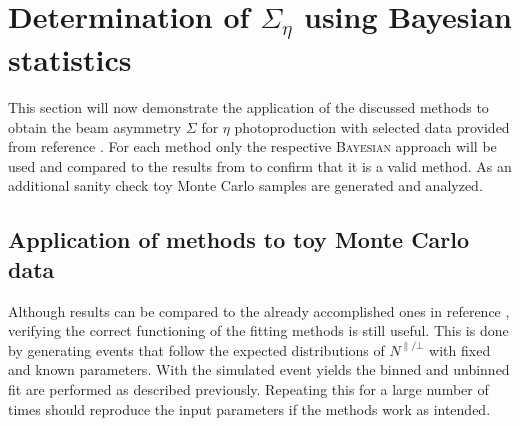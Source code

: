 \section{Determination of $\Sigma_{\eta}$ using Bayesian statistics}
This section will now demonstrate the application of the discussed methods to obtain the beam asymmetry $\Sigma$ for $\eta$ photoproduction with selected data provided from reference \cite{farahphd}. For each method only the respective \textsc{Bayesian} approach will be used and compared to the results from \cite{farahphd} to confirm that it is a valid method. As an additional sanity check toy Monte Carlo samples are generated and analyzed. 
\subsection{Application of methods to toy Monte Carlo data}
\label{subsec:toyMC}
Although results can be compared to the already accomplished ones in reference \cite{farahphd}, verifying the correct functioning of the fitting methods is still useful. This is done by generating events that follow the expected distributions of $N^{\parallel/\bot}$ with fixed and known parameters. With the simulated event yields the binned and unbinned fit are performed as described previously. Repeating this for a large number of times should reproduce the input parameters if the methods work as intended.

